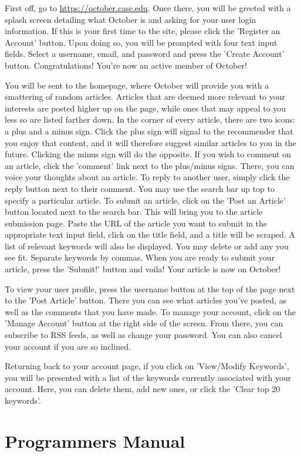\documentclass[11pt,letterpaper,titlepage]{article}
\begin{document}
First off, go to \url{https://october.case.edu}.
Once there, you will be greeted with a splash screen detailing what October is and asking for your user login information. If this is your first time to the site, please click the 'Register an Account' button.
Upon doing so, you will be prompted with four text input fields. Select a username, email, and password and press the 'Create Account' button.
Congratulations! You're now an active member of October!

You will be sent to the homepage, where October will provide you with a smattering of random articles.
Articles that are deemed more relevant to your interests are posted higher up on the page, while ones that may appeal to you less so are listed farther down.
In the corner of every article, there are two icons: a plus and a minus sign.
Click the plus sign will signal to the recommender that you enjoy that content, and it will therefore suggest similar articles to you in the future. Clicking the minus sign will do the opposite.
If you wish to comment on an article, click the 'comment' link next to the plus/minus signs.
There, you can voice your thoughts about an article.
To reply to another user, simply click the reply button next to their comment.
You may use the search bar up top to specify a particular article.
To submit an article, click on the 'Post an Article' button located next to the search bar.
This will bring you to the article submission page.
Paste the URL of the article you want to submit in the appropriate text input field, click on the title field, and a title will be scraped.
A list of relevant keywords will also be displayed.
You may delete or add any you see fit.
Separate keywords by commas.
When you are ready to submit your article, press the 'Submit!' button and voila!
Your article is now on October!

To view your user profile, press the username button at the top of the page next to the 'Post Article' button.
There you can see what articles you've posted, as well as the comments that you have made.
To manage your account, click on the 'Manage Account' button at the right side of the screen.
From there, you can  subscribe to RSS feeds, as well as change your password.
You can also cancel your account if you are so inclined.

Returning back to your account page, if you click on 'View/Modify Keywords', you will be presented with a list of the keywords currently associated with your account. Here, you can delete them, add new ones, or click the 'Clear top 20 keywords'.

\section{Programmers Manual}
\end{document}
